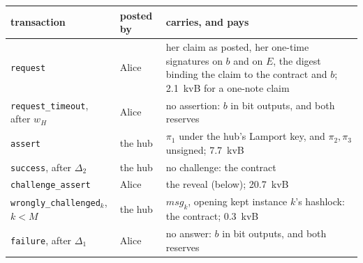 \documentclass[11pt]{article}
\newcommand{\tx}[1]{\texttt{#1}}
\begin{document}
\begin{center}
\small
\begin{tabularx}{\linewidth}{>{\raggedright\arraybackslash}p{34mm}>{\raggedright\arraybackslash}p{18mm}L}
\toprule
transaction & posted by & carries, and pays \\
\midrule
\tx{request} & Alice & her claim as posted, her one-time signatures on $b$ and on $E$, the digest binding the claim to the contract and $b$; 2.1~kvB for a one-note claim \\
\tx{request\_timeout}, after $w_H$ & Alice & no assertion: $b$ in bit outputs, and both reserves \\
\tx{assert} & the hub & $\pi_1$ under the hub's Lamport key, and $\pi_2, \pi_3$ unsigned; 7.7~kvB \\
\tx{success}, after $\Delta_2$ & the hub & no challenge: the contract \\
\tx{challenge\_assert} & Alice & the reveal (below); 20.7~kvB \\
\tx{wrongly\_\allowbreak challenged}$_k$, $k < M$ & the hub & $\mathit{msg}_k$, opening kept instance $k$'s hashlock: the contract; 0.3~kvB \\
\tx{failure}, after $\Delta_1$ & Alice & no answer: $b$ in bit outputs, and both reserves \\
\bottomrule
\end{tabularx}
\end{center}
\end{document}
